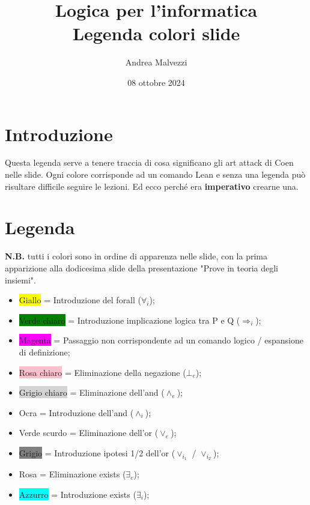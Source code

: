 \documentclass[12pt]{article}
\title{\textbf{Logica per l'informatica\\Legenda colori slide}}
\date{08 ottobre 2024}
\author{Andrea Malvezzi}
\begin{document}
\maketitle
\pagebreak
\tableofcontents
\pagebreak
\section{Introduzione}
Questa legenda serve a tenere traccia di cosa significano gli art attack di Coen nelle slide.
Ogni colore corrisponde ad un comando Lean e senza una legenda può risultare difficile seguire le lezioni.
Ed ecco perché era \textbf{imperativo} crearne una.
\section{Legenda}
\textbf{N.B.} tutti i colori sono in ordine di apparenza nelle slide, con la prima apparizione alla dodicesima slide della presentazione "Prove in teoria degli insiemi".
\begin{itemize}
    \item \colorbox{yellow}{Giallo} = Introduzione del forall ($\forall_i$);
    \item \colorbox{green}{Verde chiaro} = Introduzione implicazione logica tra P e Q ($\Rightarrow_i$);
    \item \colorbox{magenta}{Magenta} = Passaggio non corrispondente ad un comando logico / espansione di definizione;
    \item \colorbox{pink}{Rosa chiaro} = Eliminazione della negazione ($\bot_e$);
    \item \colorbox{lightgray}{Grigio chiaro} = Eliminazione dell'and ($\wedge_e$);
    \item \colorbox{goldenrod_yellow}{Ocra} = Introduzione dell'and ($\wedge_i$);
    \item \colorbox{dark_green}{Verde scurdo} = Eliminazione dell'or ($\vee_e$);
    \item \colorbox{gray}{Grigio} = Introduzione ipotesi 1/2 dell'or ($\vee_{i_1}$ / $\vee_{i_2}$);
    \item \colorbox{exists_pink}{Rosa} = Eliminazione exists ($\exists_e$);
    \item \colorbox{cyan}{Azzurro} = Introduzione exists ($\exists_i$);
\end{itemize}
\end{document}
